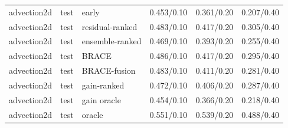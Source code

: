 \begin{tabular}{lllrrr}
advection2d & test & early & 0.453/0.10 & 0.361/0.20 & 0.207/0.40 \\
advection2d & test & residual-ranked & 0.483/0.10 & 0.417/0.20 & 0.305/0.40 \\
advection2d & test & ensemble-ranked & 0.469/0.10 & 0.393/0.20 & 0.255/0.40 \\
advection2d & test & BRACE & 0.486/0.10 & 0.417/0.20 & 0.295/0.40 \\
advection2d & test & BRACE-fusion & 0.483/0.10 & 0.411/0.20 & 0.281/0.40 \\
advection2d & test & gain-ranked & 0.472/0.10 & 0.406/0.20 & 0.287/0.40 \\
advection2d & test & gain oracle & 0.454/0.10 & 0.366/0.20 & 0.218/0.40 \\
advection2d & test & oracle & 0.551/0.10 & 0.539/0.20 & 0.488/0.40 \\
\midrule
\bottomrule
\end{tabular}
